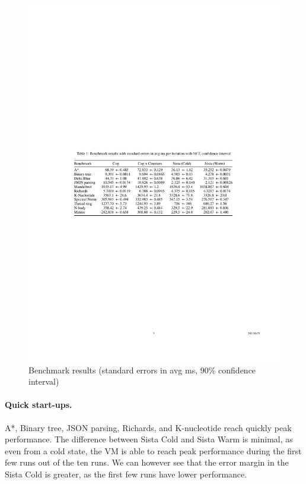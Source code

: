 \documentclass[a4paper,12pt,twoside]{../includes/ThesisStyle}
\begin{document}
\begin{figure}[h!]
    \begin{center}
        \includegraphics[width=\linewidth]{BenchTable}
        \caption{Benchmark results (standard errors in avg ms, 90\% confidence interval)}
        \label{tbl:benchmark}
	\end{center}
\end{figure}

	\paragraph{Quick start-ups.} A*, Binary tree, JSON parsing, Richards, and K-nucleotide reach quickly peak performance. The difference between Sista Cold and Sista Warm is minimal, as even from a cold state, the VM is able to reach peak performance during the first few runs out of the ten runs. We can however see that the error margin in the Sista Cold is greater, as the first few runs have lower performance.
\end{document}

